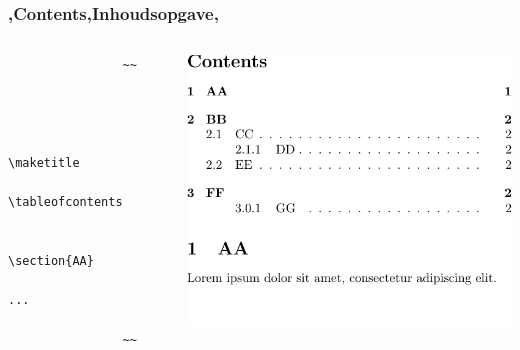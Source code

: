 
\unless\ifishandout
\begin{frame}[fragile]
    \frametitle{\lang,Contents,Inhoudsopgave,}
    
    \begin{columns}
        \begin{column}{0.5\textwidth}
            \begin{verbatim}
                ~~


                
                    \maketitle
                    \tableofcontents
        
                    \section{AA}
                    ...
                
                ~~
            \end{verbatim}
        \end{column}
        \begin{column}{0.5\textwidth}
            \includegraphics[width=\linewidth,height=0.8\textheight,keepaspectratio,page=1]{assets/tableofcontents.pdf}
            \vspace{-60pt}
        \end{column}
    \end{columns}
\end{frame}

